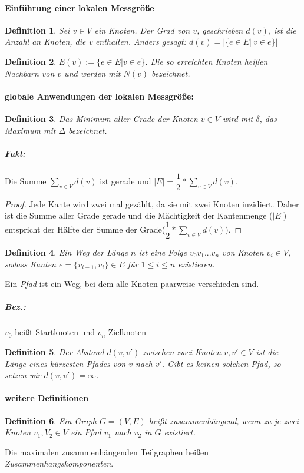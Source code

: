 \documentclass[12pt]{article}
\numberwithin{equation}{subsection}
\newtheorem{df}{Definition}
\begin{document}
	\paragraph{Einführung einer lokalen Messgröße}
	\begin{df} Sei $v\in V$ ein Knoten. Der \textit{Grad} von $v$, geschrieben $d(v)$, ist die Anzahl an Knoten, die v enthalten. Anders gesagt: $d(v)=|\{e\in E|\ v \in e\}|$
	\end{df}
	\begin{df}$E(v):=\{e\in E| v\in e\}$. Die so erreichten Knoten heißen \textit{Nachbarn} von $v$ und werden mit $N(v)$ bezeichnet.
	\end{df}
	\paragraph{globale Anwendungen der lokalen Messgröße:}
	\begin{df} Das Minimum aller Grade der Knoten $v\in V$ wird mit $\delta$, das Maximum mit $\Delta$ bezeichnet.
	\end{df}
	\subparagraph{Fakt:} Die Summe $\sum\limits_{v\in V}d(v)$ ist gerade und $|E|=\dfrac{1}{2}*\sum\limits_{v\in V}d(v)$.
	\begin{proof}
		Jede Kante wird zwei mal gezählt, da sie mit zwei Knoten inzidiert. Daher ist die Summe aller Grade gerade und die Mächtigkeit der Kantenmenge  ($|E|$) entspricht der Hälfte der Summe der Grade($\dfrac{1}{2}*\sum_{v\in V}d(v)$).
	\end{proof}
	\begin{df} Ein \textit{Weg} der Länge $n$ ist eine Folge $v_0v_1...v_n$ von Knoten $v_i\in V$, sodass Kanten $e=\{v_{i-1},v_i\}\in E$ für $1\leq i \leq n$ existieren.
	\end{df} Ein \textit{Pfad} ist ein Weg, bei dem alle Knoten paarweise verschieden sind.
	\subparagraph{Bez.:} $v_0$ heißt Startknoten und $v_n$ Zielknoten
	\begin{df} Der \textit{Abstand} $d(v,v')$ zwischen zwei Knoten $v,v'\in V$ ist die Länge eines kürzesten Pfades von $v$ nach $v'$. 
	Gibt es keinen solchen Pfad, so setzen wir $d(v,v')=\infty$.\end{df}
	\paragraph{weitere Definitionen}
	\begin{df} Ein Graph $G=(V,E)$ heißt zusammenhängend, wenn zu je zwei Knoten $v_1,V_2 \in V$ ein Pfad $v_1$ nach $v_2$ in $G$ existiert.
	\end{df} Die maximalen zusammenhängenden Teilgraphen heißen \textit{Zusammenhangskomponenten}.
\end{document}
